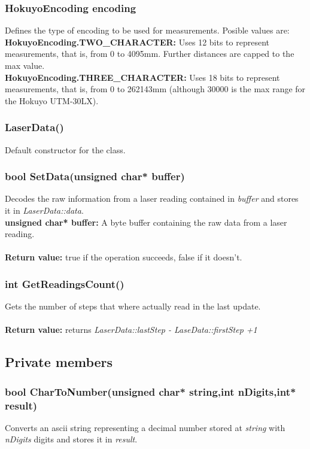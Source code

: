 \documentclass{book}
\begin{document}
\subsubsection{HokuyoEncoding encoding}
\label{sec:encoding}
Defines the type of encoding to be used for measurements. Posible values are:\\

\textbf{HokuyoEncoding.TWO\_CHARACTER: } Uses 12 bits to represent measurements, that is, from 0 to 4095mm. Further distances are capped to the max value.\\

\textbf{HokuyoEncoding.THREE\_CHARACTER: } Uses 18 bits to represent measurements, that is, from 0 to 262143mm (although 30000 is the max range for the Hokuyo UTM-30LX).\\

\subsubsection{LaserData()}
Default constructor for the class.
\subsubsection{	bool SetData(unsigned char* buffer)}
Decodes the raw information from a laser reading contained in \textit{buffer} and stores it in \textit{LaserData::data}.\\
\textbf{unsigned char* buffer: }A byte buffer containing the raw data from a laser reading.\\\\
\textbf{Return value:} true if the operation succeeds, false if it doesn't.\\

\subsubsection{int GetReadingsCount()}
Gets the number of steps that where actually read in the last update.\\\\
\textbf{Return value:} returns \textit{LaserData::lastStep - LaseData::firstStep +1}

\subsection{Private members}
\subsubsection{bool CharToNumber(unsigned char* string,int nDigits,int* result)}
Converts an ascii string representing a decimal number stored at \textit{string} with \textit{nDigits} digits and stores it in \textit{result}.
\end{document}

